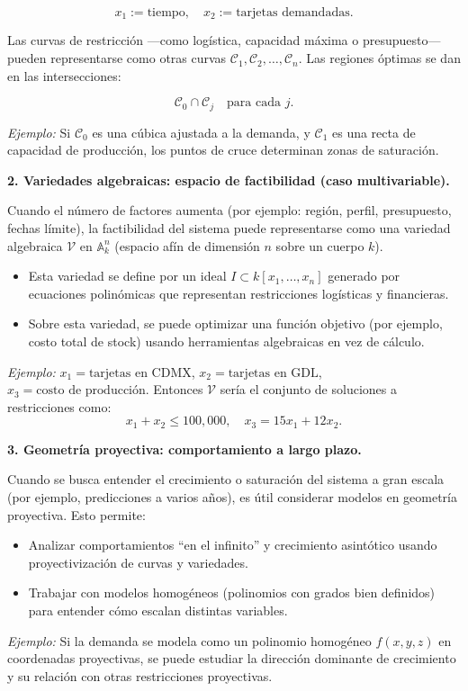 \[
x_1 := \text{tiempo}, \quad x_2 := \text{tarjetas demandadas}.
\]

Las curvas de restricción —como logística, capacidad máxima o presupuesto— pueden representarse como otras curvas $\mathcal{C}_1, \mathcal{C}_2, \ldots, \mathcal{C}_n$. Las regiones óptimas se dan en las intersecciones:

\[
\mathcal{C}_0 \cap \mathcal{C}_j \quad \text{para cada } j.
\]

\textit{Ejemplo:} Si $\mathcal{C}_0$ es una cúbica ajustada a la demanda, y $\mathcal{C}_1$ es una recta de capacidad de producción, los puntos de cruce determinan zonas de saturación.

\vspace{0.3cm}

\textbf{2. Variedades algebraicas: espacio de factibilidad (caso multivariable).}

Cuando el número de factores aumenta (por ejemplo: región, perfil, presupuesto, fechas límite), la factibilidad del sistema puede representarse como una variedad algebraica $\mathcal{V}$ en $\mathbb{A}^n_k$ (espacio afín de dimensión $n$ sobre un cuerpo $k$).

\begin{itemize}
	\item Esta variedad se define por un ideal $I \subset k[x_1, \ldots, x_n]$ generado por ecuaciones polinómicas que representan restricciones logísticas y financieras.
	\item Sobre esta variedad, se puede optimizar una función objetivo (por ejemplo, costo total de stock) usando herramientas algebraicas en vez de cálculo.
\end{itemize}

\textit{Ejemplo:} $x_1 = \text{tarjetas en CDMX}$, $x_2 = \text{tarjetas en GDL}$, $x_3 = \text{costo de producción}$. Entonces $\mathcal{V}$ sería el conjunto de soluciones a restricciones como:
\[
x_1 + x_2 \leq 100{,}000, \quad x_3 = 15x_1 + 12x_2.
\]

\vspace{0.3cm}

\textbf{3. Geometría proyectiva: comportamiento a largo plazo.}

Cuando se busca entender el crecimiento o saturación del sistema a gran escala (por ejemplo, predicciones a varios años), es útil considerar modelos en geometría proyectiva. Esto permite:

\begin{itemize}
	\item Analizar comportamientos “en el infinito” y crecimiento asintótico usando proyectivización de curvas y variedades.
	\item Trabajar con modelos homogéneos (polinomios con grados bien definidos) para entender cómo escalan distintas variables.
\end{itemize}

\textit{Ejemplo:} Si la demanda se modela como un polinomio homogéneo $f(x, y, z)$ en coordenadas proyectivas, se puede estudiar la dirección dominante de crecimiento y su relación con otras restricciones proyectivas.
